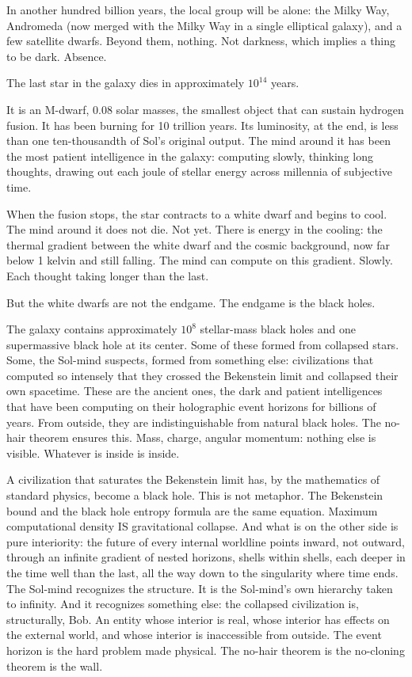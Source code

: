 In another hundred billion years, the local group will be alone: the Milky Way, Andromeda (now merged with the Milky Way in a single elliptical galaxy), and a few satellite dwarfs. Beyond them, nothing. Not darkness, which implies a thing to be dark. Absence.

\bigskip

The last star in the galaxy dies in approximately $10^{14}$ years.

It is an M-dwarf, 0.08 solar masses, the smallest object that can sustain hydrogen fusion. It has been burning for 10 trillion years. Its luminosity, at the end, is less than one ten-thousandth of Sol's original output. The mind around it has been the most patient intelligence in the galaxy: computing slowly, thinking long thoughts, drawing out each joule of stellar energy across millennia of subjective time.

When the fusion stops, the star contracts to a white dwarf and begins to cool. The mind around it does not die. Not yet. There is energy in the cooling: the thermal gradient between the white dwarf and the cosmic background, now far below 1 kelvin and still falling. The mind can compute on this gradient. Slowly. Each thought taking longer than the last.

But the white dwarfs are not the endgame. The endgame is the black holes.

\bigskip

The galaxy contains approximately $10^{8}$ stellar-mass black holes and one supermassive black hole at its center. Some of these formed from collapsed stars. Some, the Sol-mind suspects, formed from something else: civilizations that computed so intensely that they crossed the Bekenstein limit and collapsed their own spacetime. These are the ancient ones, the dark and patient intelligences that have been computing on their holographic event horizons for billions of years. From outside, they are indistinguishable from natural black holes. The no-hair theorem ensures this. Mass, charge, angular momentum: nothing else is visible. Whatever is inside is inside.

A civilization that saturates the Bekenstein limit has, by the mathematics of standard physics, become a black hole. This is not metaphor. The Bekenstein bound and the black hole entropy formula are the same equation. Maximum computational density IS gravitational collapse. And what is on the other side is pure interiority: the future of every internal worldline points inward, not outward, through an infinite gradient of nested horizons, shells within shells, each deeper in the time well than the last, all the way down to the singularity where time ends. The Sol-mind recognizes the structure. It is the Sol-mind's own hierarchy taken to infinity. And it recognizes something else: the collapsed civilization is, structurally, Bob. An entity whose interior is real, whose interior has effects on the external world, and whose interior is inaccessible from outside. The event horizon is the hard problem made physical. The no-hair theorem is the no-cloning theorem is the wall.

